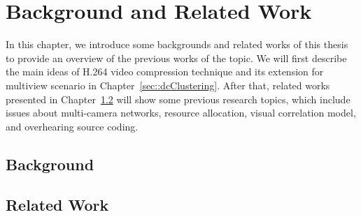 \section{Background and Related Work}
\label{sec::backgroundAndRelatedWork}
In this chapter, we introduce some backgrounds and related works of this thesis to provide an overview of the previous works of the topic.
We will first describe the main ideas of H.264 video compression technique and its extension for multiview scenario in Chapter~\ref{sec::dcClustering}.
After that, related works presented in Chapter~\ref{sec::relatedWork} will show some previous research topics, which include issues about multi-camera networks, resource allocation, visual correlation model, and overhearing source coding.
%
\subsection{Background}
\label{sec::background}



%
\subsection{Related Work}
\label{sec::relatedWork}
